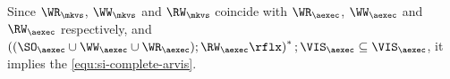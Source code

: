 \begin{itemize}
Since \( \WR_\mkvs \), \( \WW_\mkvs \) and \( \RW_\mkvs \) coincide with
\( \WR_\aexec \), \( \WW_\aexec \) and \( \RW_\aexec \) respectively,
and \( \left( (\SO_{\aexec} \cup \WW_{\aexec} \cup \WR_{\aexec} ) ; \RW_{\aexec}\rflx \right)^* ; \VIS_{\aexec}  \subseteq \VIS_\aexec \),
it implies the \cref{equ:si-complete-arvis}.

\end{itemize}
